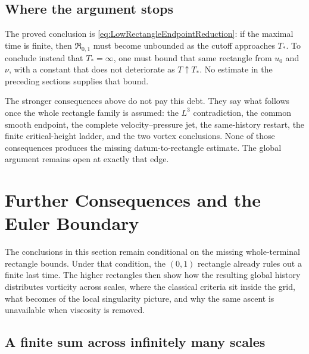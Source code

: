 \subsection{Where the argument stops}\label{sub:NoFiniteSingularTime}

The proved conclusion is \eqref{eq:LowRectangleEndpointReduction}: if the maximal time
is finite, then \(\mathfrak R_{0,1}\) must become unbounded as the cutoff approaches
\(T_*\).  To conclude instead that \(T_*=\infty\), one must bound that same rectangle
from \(u_0\) and \(\nu\), with a constant that does not deteriorate as
\(T\uparrow T_*\).  No estimate in the preceding sections supplies that bound.

The stronger consequences above do not pay this debt.  They say what follows once the
whole rectangle family is assumed: the \(L^3\) contradiction, the common smooth
endpoint, the complete velocity--pressure jet, the same-history restart, the finite
critical-height ladder, and the two vortex conclusions.  None of those consequences
produces the missing datum-to-rectangle estimate.  The global argument remains open at
exactly that edge.

\section{Further Consequences and the Euler Boundary}\label{sec:FurtherConsequencesAndEulerBoundary}

The conclusions in this section remain conditional on the missing whole-terminal
rectangle bounds.  Under that condition, the \((0,1)\) rectangle already rules out a
finite last time.  The higher rectangles then show how the resulting global history
distributes vorticity across scales, where the classical criteria sit inside the grid,
what becomes of the local singularity picture, and why the same ascent is unavailable
when viscosity is removed.

\subsection{A finite sum across infinitely many scales}\label{sub:AFiniteSumAcrossScales}


